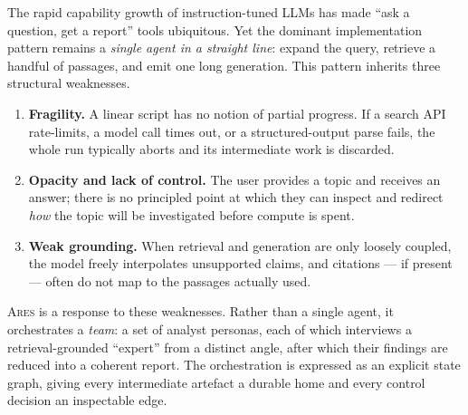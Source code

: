 \documentclass[10pt,twocolumn]{article}
\newcommand{\ares}{\textsc{Ares}}
\begin{document}
The rapid capability growth of instruction-tuned LLMs has made ``ask a question,
get a report'' tools ubiquitous. Yet the dominant implementation pattern remains
a \emph{single agent in a straight line}: expand the query, retrieve a handful of
passages, and emit one long generation. This pattern inherits three structural
weaknesses.

\begin{enumerate}[leftmargin=1.2em,itemsep=2pt]
  \item \textbf{Fragility.} A linear script has no notion of partial progress. If
  a search API rate-limits, a model call times out, or a structured-output parse
  fails, the whole run typically aborts and its intermediate work is discarded.
  \item \textbf{Opacity and lack of control.} The user provides a topic and
  receives an answer; there is no principled point at which they can inspect and
  redirect \emph{how} the topic will be investigated before compute is spent.
  \item \textbf{Weak grounding.} When retrieval and generation are only loosely
  coupled, the model freely interpolates unsupported claims, and citations --- if
  present --- often do not map to the passages actually used.
\end{enumerate}

\ares{} is a response to these weaknesses. Rather than a single agent, it
orchestrates a \emph{team}: a set of analyst personas, each of which interviews a
retrieval-grounded ``expert'' from a distinct angle, after which their findings
are reduced into a coherent report. The orchestration is expressed as an
explicit state graph, giving every intermediate artefact a durable home and every
control decision an inspectable edge.
\end{document}
